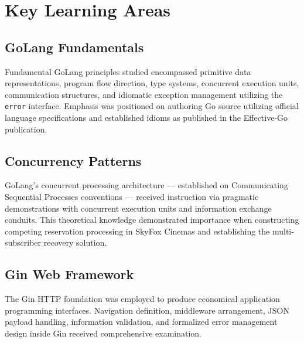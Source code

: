 \section{Key Learning Areas}

\subsection{GoLang Fundamentals}

Fundamental GoLang principles studied encompassed primitive data representations, 
program flow direction, type systems, concurrent execution units, communication structures, 
and idiomatic exception management utilizing the \texttt{error} interface. Emphasis 
was positioned on authoring Go source utilizing official language specifications 
and established idioms as published in the Effective-Go publication.

\subsection{Concurrency Patterns}

GoLang's concurrent processing architecture --- established on Communicating Sequential 
Processes conventions --- received instruction via pragmatic demonstrations with concurrent 
execution units and information exchange conduits. This theoretical knowledge demonstrated 
importance when constructing competing reservation processing in SkyFox Cinemas and 
establishing the multi-subscriber recovery solution.

\subsection{Gin Web Framework}

The Gin HTTP foundation was employed to produce economical application programming interfaces. 
Navigation definition, middleware arrangement, JSON payload handling, information validation, 
and formalized error management design inside Gin received comprehensive examination.

